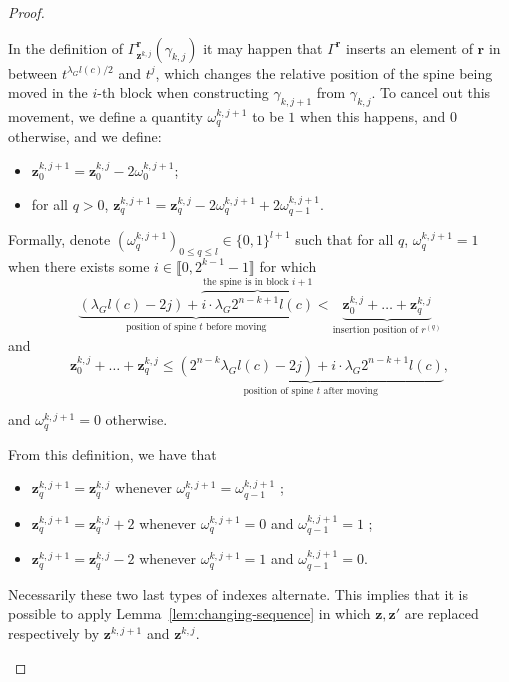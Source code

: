 \documentclass{article}
\begin{document}
\begin{proof}
\begin{enumerate}
In the definition of $\Gamma^{\textbf{r}}_{\textbf{z}^{k,j}}(\gamma_{k,j})$ it may happen that $\Gamma^\textbf{r}$ inserts an element of $\textbf{r}$ in between $t^{\lambda_G l(c)/2}$ and $t^j$, which changes the relative position of the spine being moved in the $i$-th block when constructing $\gamma_{k,j+1}$ from $\gamma_{k,j}$. To cancel out this movement, we define a quantity $\omega^{k,j+1}_q$ to be $1$ when this happens, and $0$ otherwise, and we define:
\begin{itemize}
    \item $\textbf{z}^{k,j+1}_0 = \textbf{z}^{k,j}_0  - 2 \omega^{k,j+1}_0$;
    \item for all $q>0$, $\textbf{z}^{k,j+1}_q = \textbf{z}^{k,j}_q  - 2 \omega^{k,j+1}_q + 2 \omega^{k,j+1}_{q-1}$.
\end{itemize}
Formally, denote $(\omega^{k,j+1}_q)_{0 \le q \le %
l} \in \{0,1\}^{l+1}$  such that for all %
$q$, 
$\omega^{k,j+1}_q = 1$ when there exists some $i \in \llbracket 0, 2^{k-1}-1\rrbracket$ for which 
\[\underbrace{\left(\lambda_G l(c) - 2j\right) + \overbrace{i \cdot \lambda_G 2^{n-k+1} l(c)}^{\text{the spine is in block $i+1$}}}_{\text{position of spine $t$ before moving}}  < \underbrace{\textbf{z}^{k,j}_0 + \ldots + \textbf{z}^{k,j}_q}_{\text{insertion position of $r^{(q)}$}}\]
and 
\[ \textbf{z}^{k,j}_0 + \ldots + \textbf{z}^{k,j}_q \leq \underbrace{\left(2^{n-k} \lambda_G l(c) - 2j\right)+ i \cdot \lambda_G 2^{n-k+1} l(c)}_{\text{position of spine $t$ after moving}},\]

and $\omega^{k,j+1}_q=0$ otherwise.  

From this definition, we have that
\begin{itemize}
    \item $\textbf{z}^{k,j+1}_q = \textbf{z}^{k,j}_q$ whenever $\omega^{k,j+1}_q = \omega^{k,j+1}_{q-1}$ ;
    \item $\textbf{z}^{k,j+1}_q = \textbf{z}^{k,j}_q + 2$ whenever $\omega^{k,j+1}_q = 0$ and $\omega^{k,j+1}_{q-1} = 1$ ;
    \item $\textbf{z}^{k,j+1}_q = \textbf{z}^{k,j}_q - 2$ whenever $\omega^{k,j+1}_q = 1$ and $\omega^{k,j+1}_{q-1} = 0$.
\end{itemize}
Necessarily these two last types of indexes alternate. This implies that it is 
possible to apply Lemma~\ref{lem:changing-sequence} in which $\textbf{z},\textbf{z}'$ are replaced respectively by $\textbf{z}^{k,j+1}$ and $\textbf{z}^{k,j}$.


\end{enumerate}
\end{proof}
\end{document}
